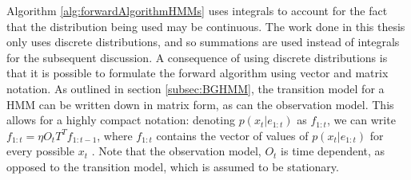 
Algorithm \ref{alg:forwardAlgorithmHMMs} uses integrals to account for the fact that the distribution being used may be continuous. The work done in this thesis only uses discrete distributions, and so summations are used instead of integrals for the subsequent discussion. A consequence of using discrete distributions is that it is possible to formulate the forward algorithm using vector and matrix notation. As outlined in section \ref{subsec:BGHMM}, the transition model for a HMM can be written down in matrix form, as can the observation model. This allows for a highly compact notation: denoting $p(x_t | e_{1:t})$ as $f_{1:t}$, we can write $f_{1:t} = \eta O_{t} T^{T} f_{1:t-1}$, where $f_{1:t}$ contains the vector of values of $p(x_t | e_{1:t})$ for every possible $x_t$ \cite[p.~579]{AIAMA}. Note that the observation model, $O_t$ is time dependent, as opposed to the transition model, which is assumed to be stationary. \par

